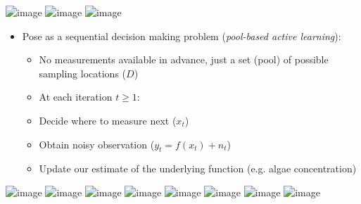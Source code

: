 \documentclass[10pt,mathserif,serif]{beamer}
\begin{document}
\begin{frame}
\begin{center}
\vspace{0.2in}
\includegraphics<1>[width=4.7in]{figures/limno_bgape_sc}
\includegraphics<2>[width=4.7in]{figures/limno_bgape}
\includegraphics<3>[width=4.7in]{figures/limno_bgape_ls}
\end{center}
\end{frame}

\begin{frame}
\begin{itemize}
\item<1-> Pose as a sequential decision making problem (\emph{pool-based active learning}):
\begin{itemize}
\item<2-> No measurements available in advance, just a set (pool) of possible sampling locations ($D$)
\vspace{0.5em}
\item<3->[]\hspace{-1.5em} At each iteration $t \geq 1$:
\item<3-> Decide where to measure next ($x_t$)
\item<4-> Obtain noisy observation ($y_t = f(x_t) + n_t$)
\item<5-> Update our estimate of the underlying function (e.g. algae concentration)
\end{itemize}
\end{itemize}
\begin{center}
\color{white}
\includegraphics<1>[draft,width=4.45in]{figures/oned_0}
\color{black}
\includegraphics<2>[width=4.45in]{figures/oned_0}
\includegraphics<3>[width=4.45in]{figures/oned_1_0}
\includegraphics<4>[width=4.45in]{figures/oned_1_1}
\includegraphics<5>[width=4.45in]{figures/oned_1_2}
\includegraphics<6>[width=4.45in]{figures/oned_2_0}
\includegraphics<7>[width=4.45in]{figures/oned_2_1}
\includegraphics<8>[width=4.45in]{figures/oned_2_2}
\end{center}
\end{frame}
\end{document}
